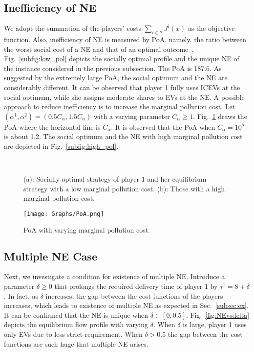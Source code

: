 \documentclass[letterpaper, 10 pt, conference]{ieeeconf}  %
\newcommand{\mc}[1]{\mathcal{#1}}
\begin{document}
\subsection{Inefficiency of NE}

We adopt the summation of the players' costs $\sum_{i\in\mc{I}}J^i(x)$ as the objective function.
Also, inefficiency of NE is measured by PoA, namely, the ratio between the worst social cost of a NE and that of an optimal outcome~\cite[Chap.~17]{Roughgarden2007Game}.
Fig.~\ref{subfig:low_pol} depicts the socially optimal profile and the unique NE of the instance considered in the previous subsection.
The PoA is 187.6.
As suggested by the extremely large PoA, the social optimum and the NE are considerably different.
It can be observed that player 1 fully uses ICEVs at the social optimum, while she assigns moderate shares to EVs at the NE.
A possible approach to reduce inefficiency is to increase the marginal pollution cost.
Let $(\alpha^1,\alpha^2)=(0.5C_{\alpha},1.5C_{\alpha})$ with a varying parameter $C_{\alpha}\geq1$.
Fig.~\ref{fig:PoAcurve} draws the PoA where the horizontal line is $C_{\alpha}$.
It is observed that the PoA when $C_{\alpha}=10^5$ is about 1.2.
The social optimum and the NE with high marginal pollution cost are depicted in Fig.~\ref{subfig:high_pol}.

\begin{figure}[t]
\centering
{}\\
\caption[]{(a): Socially optimal strategy of player 1 and her equilibrium strategy with a low marginal pollution cost. (b): Those with a high marginal pollution cost.}
\end{figure}


\begin{figure}[t]
  \centering
  \texttt{[image: Graphs/PoA.png]}
  \caption{
   PoA with varying marginal pollution cost.
  }
  \label{fig:PoAcurve}
\end{figure}



\subsection{Multiple NE Case}
Next, we investigate a condition for existence of multiple NE.
Introduce a parameter $\delta\geq0$ that prolongs the required delivery time of player 1 by $\tau^1=8+\delta$.
In fact, as $\delta$ increases, the gap between the cost functions of the players increases, which leads to existence of multiple NE as expected in Sec.~\ref{subsec:ex}.
It can be confirmed that the NE is unique when $\delta \in [0,0.5]$.
Fig.~\ref{fig:NEvsdelta} depicts the equilibrium flow profile with varying $\delta$.
When $\delta$ is large, player 1 uses only EVs due to less strict requirement.
When $\delta>0.5$ the gap between the cost functions are such huge that multiple NE arises.
\end{document}
